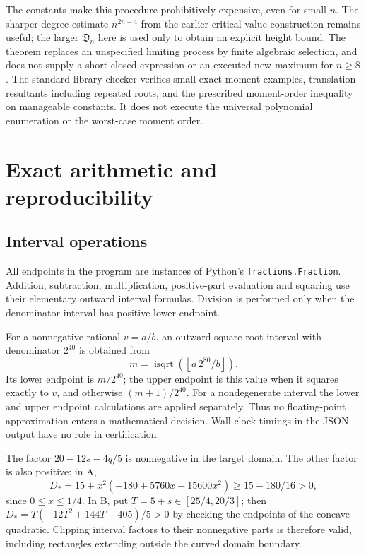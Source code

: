 \documentclass[11pt]{article}
\theoremstyle{remark}
\numberwithin{equation}{section}
\begin{document}
The constants make this procedure prohibitively expensive, even for
small $n$. The sharper degree estimate $n^{2n-4}$ from
the earlier critical-value construction remains useful; the larger $\mathfrak{D}_n$ here
is used only to obtain an explicit height bound. The theorem replaces
an unspecified limiting process by finite algebraic selection, and
does not supply a short closed expression or an executed new maximum
for $n\ge8$. The standard-library checker
 verifies small exact moment examples,
translation resultants including repeated roots, and the prescribed
moment-order inequality on manageable constants. It does not execute
the universal polynomial enumeration or the worst-case moment order.



\section{Exact arithmetic and reproducibility}\label{ref5-app:certificate}
\subsection{Interval operations}
All endpoints in the program are instances of Python's
\texttt{fractions.Fraction}. Addition, subtraction, multiplication,
positive-part evaluation and squaring use their elementary outward
interval formulas. Division is performed only when the denominator
interval has positive lower endpoint.

For a nonnegative rational $v=a/b$, an outward square-root interval
with denominator $2^{40}$ is obtained from
\[
 m=\operatorname{isqrt}\left(\left\lfloor
              a\,2^{80}/b\right\rfloor\right).
\]
Its lower endpoint is $m/2^{40}$; the upper endpoint is this value
when it squares exactly to $v$, and otherwise $(m+1)/2^{40}$.
For a nondegenerate interval the lower and upper endpoint calculations
are applied separately. Thus no floating-point approximation enters
a mathematical decision. Wall-clock timings in the JSON output have
no role in certification.

The factor $20-12s-4q/5$ is nonnegative in the target domain.
The other factor is also positive: in A,
\[
 D_*=15+x^2(-180+5760x-15600x^2)\ge15-180/16>0,
\]
since $0\le x\le1/4$.
In B, put $T=5+s\in[25/4,20/3]$; then
$D_*=T(-12T^2+144T-405)/5>0$ by checking the endpoints of the
concave quadratic. Clipping interval factors to their nonnegative
parts is therefore valid, including rectangles extending outside the
curved domain boundary.
\end{document}
